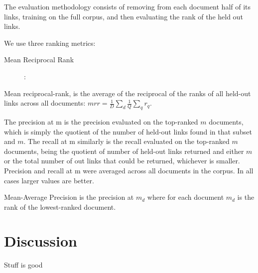 \documentclass{sciposter}
\begin{document}
\begin{multicols}{3}
The evaluation methodology consists of removing from each document half of its links, training on the full corpus, and then evaluating the rank of the held out links.

We use three ranking metrics:
\begin{description}
\item[Mean Reciprocal Rank]: 
\end{description}


Mean reciprocal-rank, is the average of the reciprocal of the ranks of all held-out links across all documents: $mrr = \frac{1}{D} \sum_d \frac{1}{Q} \sum_q r_q$.  

The precision at m is the precision evaluated on the top-ranked $m$ documents, which is simply the quotient of the number of held-out links found in that subset and $m$. The recall at m similarly is the recall evaluated on the top-ranked $m$ documents, being the quotient of number of held-out links returned and either $m$ or the total number of out links that could be returned, whichever is smaller. Precision and recall at m were averaged across all documents in the corpus. In all cases larger values are better.

Mean-Average Precision is the precision at $m_d$ where for each document $m_d$ is the rank of the lowest-ranked document.

\section{Discussion}

Stuff is good
 






\end{multicols}
\end{document}
